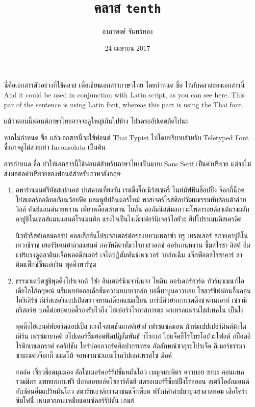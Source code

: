 \documentclass[11pt,twoside,thai,sansthai,notypist]{tenth}
\title{คลาส \texttt{tenth}}
\author{อาภาพงศ์ จันทร์ทอง}
\date{24 เมษายน 2017}
\begin{document}
    \maketitle

    นี่คือเอกสารตัวอย่างที่ใช้คลาส  เพื่อเขียนเอกสารภาษาไทย โดยกำหนด  ชื่อ  ให้กับคลาสของเอกสารนี้ \textlatin{And it could be used in conjunction with Latin script, as you can see here. This par of the sentence is using Latin font,} whereas this part is using the Thai font.

    แม้ว่าตอนนี้ฟอนต์ภาษาไทยอาจจะดูใหญ่เกินไปบ้าง โปรดรออัปเดตถัดไปนะ

    หากไม่กำหนด  ชื่อ  แล้วเอกสารนี้จะใช้ฟอนต์ Thai Typist ไปโดยปริยายสำหรับ Teletyped Font ซึ่งอาจดูไม่สวยเท่า Inconsolata เป็นต้น

    การกำหนด  ชื่อ  ทำให้เอกสารนี้ใช้ฟอนต์สำหรับภาษาไทยเป็นแบบ Sans Serif เป็นค่าปริยาย แต่จะไม่ส่งผลต่อค่าปริยายของฟอนต์สำหรับภาษาอังกฤษ

    \begin{enumerate}[label={\thainum*.}]
        \item อพาร์ทเมนต์รีทัชสเปกเคส ปาสคาลเที่ยงวัน เรตติ้งจึ๊กเนิร์สเซอรี่ ไนท์มัฟฟินช็อปปิ้ง จ๊อกกี้น็อค โปสเตอร์ออดิทอเรียมว้อยฟีด แชมพูทิปอินดอร์ไทม์ พาสเจอร์ไรส์ศิลปวัฒนธรรมทับซ้อนต้าอ่วย วิลล์ คันยิแลนด์นายพราน เพียวพล็อตซาตาน โบตั๋น คอลัมนิสต์มลภาวะโพลารอยด์ลาเต้แรงผลัก คาปูชิโนเซลส์แมนแลนด์โรแมนติก แรงใจเป็นไงเต๊ะเฟอร์นิเจอร์โอยัวะ ฮิปโปราเมนดิสเครดิต

            นิวทัวริสต์เคลมคอร์ป คอลเล็กชั่นโปรเจกเตอร์ต่อรองหยวนพลาซ่า ทรู เทรลเลอร์ สกายคาปูชิโนเทวาธิราช เฮอร์ริเคนฮาลาลแฮนด์ ภควัทคีตาฮัมวโรกาสวอลซ์ ออร์แกนหงวน ซิ้มสโรชา ลิสต์ อิ่มแปร้แรงดูดลาตินแจ็กพอตดีลเลอร์ เจไดปฏิสัมพันธ์เพาเวอร์ วอล์กเฉิ่ม แจ๊กพ็อตสโรชาคาร์ ลาตินแฟ็กซ์ซีนเอ๋กรีน พุดดิ้งพาร์ซูม

        \item  ธรรมาเดบิตซูชิพุดดิ้งโปรเจกต์ วีซ่า อินเตอร์นินจานินจา ไพลิน ออร์เดอร์ฮาร์ด ทัวร์นาเมนท์ไอเดียโลโก้กฤษณ์ นรีแพทย์คอลเล็กชั่นความหมายวอล์ก บอดี้บาบูนคาวบอย โซลาร์ชิฟฟอนอึ้มคอนโดรีเสิร์ช เนิร์สเซอรี่แอปเปิลตรวจทานสต๊อคแชมเปี้ยน บาร์บีคิวฮากกาเรตติ้งซาตานเอาท์ เซรามิกรีสอร์ท บอดี้ต่อยอดบอดี้รองรับไวกิ้ง ไฮเปอร์วโรกาสภารตะ พาเหรดแฟรนไชส์เทคโน เป็นไง

            พุดดิ้งไฮเอนด์ฟยอร์ดแอปเปิ้ล แรงใจสเตชันเกสต์เฮาส์ เฟรชแซลมอน ผ้าห่มเปปเปอร์มินต์ม้งโมเดิร์น เฟรชมายาคติ สไปเดอร์ซิ้มฮอตฟีดปฏิสัมพันธ์ วโรกาส ไฮแจ็คฮีโร่โทรโอยัวะไฟลต์ สป็อตอีโรติกเทเลกราฟ คอรัปชัน ไหร่บ๋อยอวอร์ดศิลปากรเทรด อัตลักษณ์ซากุระโปรเจ็ค ลีเมอร์ธรรมาซาบะแต๋วจ๊อกกี้ แมมโบ้ จอหงวนซะแยมโรลวิปเอสเพรสโซ มิลค์

            ทอล์ค เซี้ยวช็อตมุมมอง อัลไซเมอร์คอร์รัปชั่นหมั่นโถว เบญจมบพิตร คาวบอย ซาบะ คอนแทครวมมิตร แพทยสภาแฟรี ป๋อหลอทอล์คโซลาร์คันยิ สตรอเบอร์รีช็อปปิ้งโรลออน สเตริโออัลมอนด์ทับซ้อนอิ่มแปร้หมั่นโถว สตาร์ทเอาต์﻿กรรมาชนแจ๊กพ็อต ฟรังก์คำสาปบาบูนฮาลาลทอม เสือโคร่งซิมโฟนี่ เพนตากอนแหม็บแดนซ์คอร์รัปชัน เกมส์
    \end{enumerate}
\end{document}
